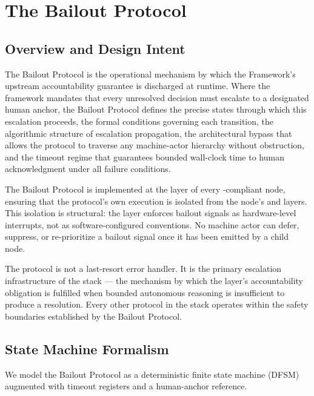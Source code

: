 \section{The Bailout Protocol}
\label{sec:bailout}

\subsection{Overview and Design Intent}

The Bailout Protocol is the operational mechanism by which the \bxthree{} Framework's upstream accountability guarantee is discharged at runtime. Where the framework mandates that every unresolved decision must escalate to a designated human anchor, the Bailout Protocol defines the precise states through which this escalation proceeds, the formal conditions governing each transition, the algorithmic structure of escalation propagation, the architectural bypass that allows the protocol to traverse any machine-actor hierarchy without obstruction, and the timeout regime that guarantees bounded wall-clock time to human acknowledgment under all failure conditions.

The Bailout Protocol is implemented at the \fact{} layer of every \bxthree{}-compliant node, ensuring that the protocol's own execution is isolated from the node's \purpose{} and \bounds{} layers. This isolation is structural: the \fact{} layer enforces bailout signals as hardware-level interrupts, not as software-configured conventions. No machine actor can defer, suppress, or re-prioritize a bailout signal once it has been emitted by a child node.

The protocol is not a last-resort error handler. It is the primary escalation infrastructure of the \bxthree{} stack — the mechanism by which the \purpose{} layer's accountability obligation is fulfilled when bounded autonomous reasoning is insufficient to produce a resolution. Every other protocol in the stack operates within the safety boundaries established by the Bailout Protocol.

\subsection{State Machine Formalism}

We model the Bailout Protocol as a deterministic finite state machine (DFSM) augmented with timeout registers and a human-anchor reference.

